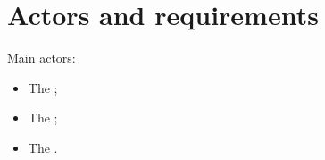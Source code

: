\chapter{Actors and requirements}\label{ch:requirements}

Main actors:
\begin{itemize}
	\item The ;
	\item The ;
	\item The .
\end{itemize}



